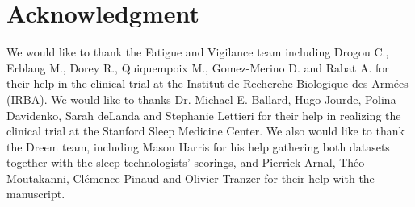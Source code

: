 \documentclass[journal]{IEEEtran}
\begin{document}
 








\section*{Acknowledgment}

We would like to thank the Fatigue and Vigilance team including Drogou C., Erblang M., Dorey R., Quiquempoix M., Gomez-Merino D. and Rabat A. for their help in the clinical trial at the Institut de Recherche Biologique des Arm\'ees (IRBA).  We would like to thanks Dr. Michael E. Ballard, Hugo Jourde, Polina Davidenko, Sarah deLanda and Stephanie  Lettieri for  their help  in  realizing  the  clinical  trial  at  the  Stanford  Sleep Medicine Center. We also would like to thank the Dreem team, including Mason Harris for his help gathering both datasets together with the sleep technologists' scorings, and Pierrick Arnal, Th\'eo Moutakanni, Cl\'emence Pinaud and Olivier Tranzer for their help with the manuscript.




\ifCLASSOPTIONcaptionsoff
  \newpage
\fi
\clearpage
\pagebreak
\appendices
\end{document}
